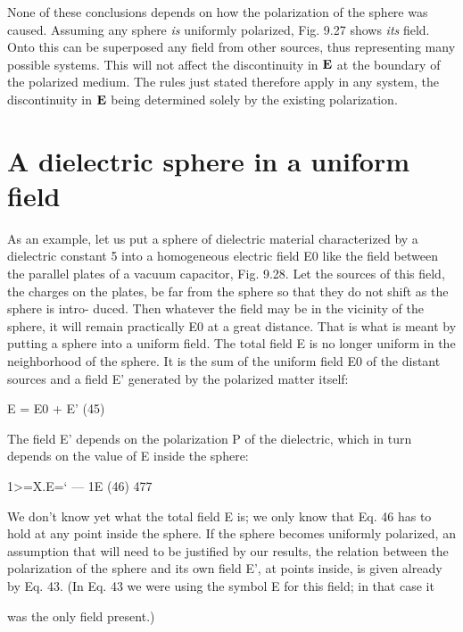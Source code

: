 None of these conclusions depends on how the polarization of
the sphere was caused. Assuming any sphere \emph{is} uniformly polarized,
Fig. 9.27 shows \emph{its} field. Onto this can be superposed any field from
other sources, thus representing many possible systems. This will
not affect the discontinuity in $\mathbf{E}$ at the boundary of the polarized
medium. The rules just stated therefore apply in any system, the
discontinuity in $\mathbf{E}$ being determined solely by the existing polarization.

\iffalse

\section{A dielectric sphere in a uniform field}

As an example, let us put a sphere of dielectric material characterized
by a dielectric constant 5 into a homogeneous electric field E0
like the field between the parallel plates of a vacuum capacitor,
Fig. 9.28. Let the sources of this field, the charges on the plates,
be far from the sphere so that they do not shift as the sphere is intro-
duced. Then whatever the field may be in the vicinity of the sphere,
it will remain practically E0 at a great distance. That is what is meant
by putting a sphere into a uniform field. The total field E is no
longer uniform in the neighborhood of the sphere. It is the sum of
the uniform field E0 of the distant sources and a field E' generated
by the polarized matter itself:

\begin{equation}
\end{equation}
E = E0 + E' (45)

The field E' depends on the polarization P of the dielectric, which in
turn depends on the value of E inside the sphere:

\begin{equation}
\end{equation}
1>=X.E=‘ --- 1E (46)
477

We don't know yet what the total field E is; we only know that
Eq. 46 has to hold at any point inside the sphere. If the sphere becomes
uniformly polarized, an assumption that will need to be
justified by our results, the relation between the polarization of the
sphere and its own field E', at points inside, is given already by Eq. 43.
(In Eq. 43 we were using the symbol E for this field; in that case it

was the only field present.)

